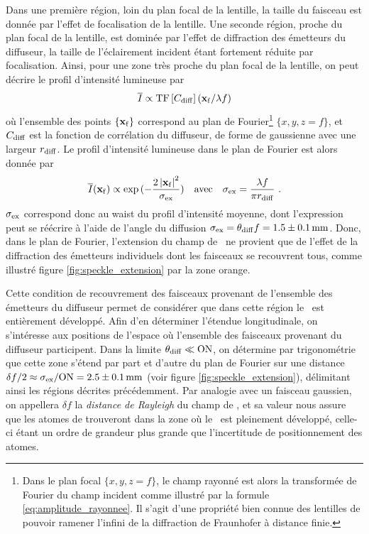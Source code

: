 Dans une première région, loin du plan focal de la lentille, la taille du faisceau est donnée par l'effet de focalisation de la lentille. Une seconde région, proche du plan focal de la lentille, est dominée par l'effet de diffraction des émetteurs du diffuseur, la taille de l'éclairement incident étant fortement réduite par focalisation. Ainsi, pour une zone très proche du plan focal de la lentille, on peut décrire le profil d'intensité lumineuse par 
\begin{equation}
\overline{I}\propto \mathrm{TF} \left[ C_{\mathrm{diff}} \right] (\mathbf{x}_{\mathrm{f}}/\lambda f)
\end{equation}
où l'ensemble des points $\lbrace \mathbf{x}_{\mathrm{f}} \rbrace$ correspond au plan de Fourier\footnote{Dans le plan focal $\lbrace x,y,z=f\rbrace$, le champ rayonné est alors la transformée de Fourier du champ incident comme illustré par la formule \ref{eq:amplitude_rayonnee}. Il s'agit d'une propriété bien connue des lentilles de pouvoir ramener l'infini de la diffraction de Fraunhofer à distance finie.} $\lbrace x,y,z=f \rbrace$, et $C_{\mathrm{diff}}$ est la fonction de corrélation du diffuseur, de forme de gaussienne avec une largeur $r_{\mathrm{diff}}$. Le profil d'intensité lumineuse dans le plan de Fourier est alors donnée par 
\begin{equation}
\overline{I}(\mathbf{x}_{\mathrm{f}})\propto \exp{(-\frac{2 \left| \mathbf{x}_{\mathrm{f}}\right|^2}{\sigma_{\mathrm{ex}}})} \quad \text{avec} \quad \sigma_{\mathrm{ex}} = \frac{\lambda f}{\pi r_{\mathrm{diff}}} \text{ .}
\label{eq:intensite_moyenne_speckle}
\end{equation}
$\sigma_{\mathrm{ex}}$ correspond donc au waist du profil d'intensité moyenne, dont l'expression peut se réécrire à l'aide de l'angle du diffusion $\sigma_{\mathrm{ex}}=\theta_{\mathrm{diff}} f = 1.5\pm\SI{0.1}{\milli\metre}$. Donc, dans le plan de Fourier, l'extension du champ de \speckle\ ne provient que de l'effet de la diffraction des émetteurs individuels dont les faisceaux se recouvrent tous, comme illustré figure \ref{fig:speckle_extension} par la zone orange.

Cette condition de recouvrement des faisceaux provenant de l'ensemble des émetteurs du diffuseur permet de considérer que dans cette région le \speckle\ est entièrement développé. Afin d'en déterminer l'étendue longitudinale, on s'intéresse aux positions de l'espace où l'ensemble des faisceaux provenant du diffuseur participent. Dans la limite $\theta_{\mathrm{diff}} \ll \mathrm{ON}$, on détermine par trigonométrie que cette zone s'étend par part et d'autre du plan de Fourier sur une distance $\delta f/2\approx \sigma_{\mathrm{ex}} /\mathrm{ON} =2.5\pm\SI{0.1}{\milli\metre}$ (voir figure \ref{fig:speckle_extension}), délimitant ainsi les régions décrites précédemment. Par analogie avec un faisceau gaussien, on appellera $\delta f$ la \emph{distance de Rayleigh} du champ de \speckle , et sa valeur nous assure que les atomes de trouveront dans la zone où le \speckle\ est pleinement développé, celle-ci étant un ordre de grandeur plus grande que l'incertitude de positionnement des atomes.















